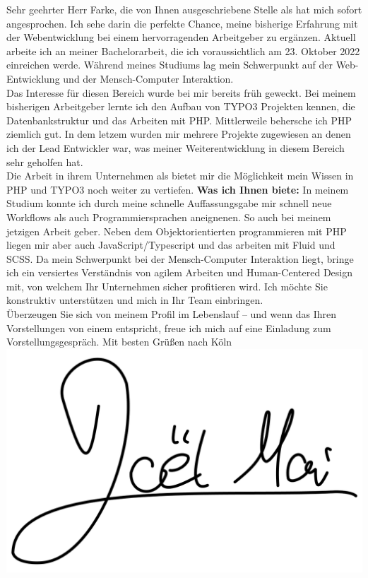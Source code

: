 \documentclass[10pt,A4]{article}
\begin{document}
Sehr geehrter Herr Farke,
\newline\newline
die von Ihnen ausgeschriebene Stelle als \jobposition hat mich sofort angesprochen. Ich sehe darin die perfekte Chance, meine bisherige Erfahrung mit der Webentwicklung bei einem hervorragenden Arbeitgeber zu ergänzen. Aktuell arbeite ich an meiner Bachelorarbeit, die ich voraussichtlich am 23. Oktober 2022 einreichen werde. Während meines Studiums lag mein Schwerpunkt auf der Web-Entwicklung und der Mensch-Computer Interaktion. \\
Das Interesse für diesen Bereich wurde bei mir bereits früh geweckt. Bei meinem bisherigen Arbeitgeber lernte ich den Aufbau von TYPO3 Projekten kennen, die Datenbankstruktur und das Arbeiten mit PHP. Mittlerweile behersche ich PHP ziemlich gut. In dem letzem wurden mir mehrere Projekte zugewiesen an denen ich der Lead Entwickler war, was meiner Weiterentwicklung in diesem Bereich sehr geholfen hat. \\
Die Arbeit in ihrem Unternehmen als \jobposition bietet mir die Möglichkeit mein Wissen in PHP und TYPO3 noch weiter zu vertiefen.
\newline\newline
\textbf{Was ich Ihnen biete:} 
\newline\newline
In meinem Studium konnte ich durch meine schnelle Auffassungsgabe mir schnell neue Workflows als auch Programmiersprachen aneignenen. So auch bei meinem jetzigen Arbeit geber. Neben dem Objektorientierten programmieren mit PHP liegen mir aber auch JavaScript/Typescript und das arbeiten mit Fluid und SCSS. Da mein Schwerpunkt bei der Mensch-Computer Interaktion liegt, bringe ich ein versiertes Verständnis von agilem Arbeiten und Human-Centered Design mit, von welchem Ihr Unternehmen sicher profitieren wird. Ich möchte Sie konstruktiv unterstützen und mich in Ihr Team einbringen.\\
Überzeugen Sie sich von meinem Profil im Lebenslauf – und wenn das Ihren Vorstellungen von einem \jobposition entspricht, freue ich mich auf eine Einladung zum Vorstellungsgespräch.
\newline\newline
Mit besten Grüßen nach Köln
\newline\newline
\includegraphics[scale=0.3]{assets/images/signature.png}
\end{document}
